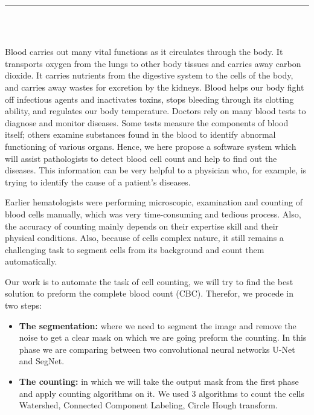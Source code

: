 \pagestyle{myfancy}


\setcounter{page}{1}

\begin{center}
    {\color{Black} \rule{6.2in}{1.4mm} }\\
    \vspace{0.1in}
    \scshape{\fontsize{34}{46}{\bfseries{\color{Black}{Introduction}}
    }}
    \\
    
    \vspace{0.5in}
\end{center}
\hspace*{0.16in}

Blood carries out many vital functions as it circulates through the body. It transports oxygen from the lungs to other body tissues and carries away carbon dioxide. It carries nutrients from the digestive system to the cells of the body, and carries away wastes for excretion by the kidneys. Blood helps our body fight off infectious agents and inactivates toxins, stops bleeding through its clotting ability, and regulates our body temperature. Doctors rely on many blood tests to diagnose and monitor diseases. Some tests measure the components of blood itself; others examine substances found in the blood to identify abnormal functioning of various organs. Hence, we here propose a software system which will assist pathologists to detect blood cell count and help to find out the diseases. This information can be very helpful to a physician who, for example, is trying to identify the cause of a patient's diseases.

Earlier hematologists were performing microscopic, examination and counting of blood cells manually, which was very time-consuming and tedious process. Also, the accuracy of counting mainly depends on their expertise skill and their physical conditions. Also, because of cells complex nature, it still remains a challenging task to segment cells from its background and count them automatically.

Our work is to automate the task of cell counting, we will try to find the best solution to preform the complete blood count (CBC). Therefor, we procede in two steps:
\begin{itemize}
    \item \textbf{The segmentation:} where we need to segment the image and remove the noise to get a clear mask on which we are going preform the counting. In this phase we are comparing between two convolutional neural networks U-Net and SegNet.
    \item \textbf{The counting:} in which we will take the output mask from the first phase and apply counting algorithms on it. We used 3 algorithms to count the cells Watershed, Connected Component Labeling, Circle Hough transform.\
\end{itemize}

